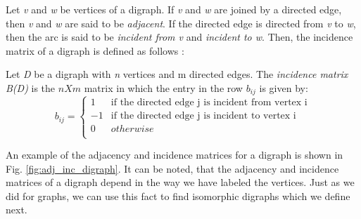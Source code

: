 Let \textit{v} and \textit{w} be vertices of a digraph. If \textit{v} and \textit{w} are joined by a directed edge, then \textit{v} and \textit{w} are said to be \textit{adjacent}. If the directed edge is directed from \textit{v} to \textit{w}, then the arc is said to be \textit{incident from v} and \textit{incident to w}. Then, the incidence matrix of a digraph is defined as follows \cite{wilsonwatkins}:

\begin{defn}
Let \textit{D} be a digraph with \textit{n} vertices and m directed edges. The \textit{incidence matrix B(D)} is the $nXm$ matrix in which the entry in the row $b_{ij}$ is given by:
\begin{equation}	
	b_{ij} = \begin{cases}
		1 & \text{if the directed edge j is incident from vertex i} \\
		-1 & \text{if the directed edge j is incident to vertex i} \\
		0 & otherwise \\
		\end{cases}
\end{equation}
\end{defn}

An example of the adjacency and incidence matrices for a digraph is shown in Fig. \ref{fig:adj_inc_digraph}.
It can be noted, that the adjacency and incidence matrices of a digraph depend in the way we have labeled the vertices. Just as we did for graphs, we can use this fact to find isomorphic digraphs which we define next. %

